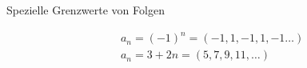 \begin{highlight}{Spezielle Grenzwerte von Folgen}
\begin{comment}
            \frac{1 - \cos n}{n^2} &\to \frac{1}{2}
        \end{align*}
    \end{minipage}
    \hfill\vline\hfill
    \begin{minipage}{0.3\linewidth}
        \begin{align*}
            \frac{1}{\arctan n} &\to 1\\
            \frac{e^n - 1}{n} &\to 1\\
            \frac{e^an - 1}{n} &\to a\\
            \left(1 + n\right)^{\frac{1}{n}} &\to e
        \end{align*}
    \end{minipage}
    \tcbsubtitle{Weitere Grenzwerte}
     \begin{minipage}{0.3\linewidth}
        \emph{$n \to -\infty$}
        \begin{align*}
            e^n &\to 0\\
            e^{-n} &\to \infty\\
            ne^n &\to 0
        \end{align*}
        \emph{$n \to 0+$}
        \begin{align*}
            n \ln n &\to 0
        \end{align*}
    \end{minipage}
    \hfill\vline\hfill
    \begin{minipage}{0.3\linewidth}
        \emph{$n \to \pm\infty$}
        \begin{align*}
            \left(1 + \frac{1}{n}\right)^n &\to e\\
            \left(1 + \frac{x}{n}\right)^an &\to e^ax
        \end{align*}
    \end{minipage}
    \hfill\vline\hfill
    \begin{minipage}{0.3\linewidth}
    \emph{$n \to \frac{\pi-}{2}$}
        \begin{align*}
            \tan x &\to +\infty
        \end{align*}
    \emph{$n \to \frac{\pi+}{2}$}
        \begin{align*}
            \tan x &\to -\infty
        \end{align*}
    \end{minipage}
    \end{comment}
    \begin{align*}
        &a_{n}=(-1)^{n}=(-1,1,-1,1,-1 \ldots) \\
        &a_{n}=3+2 n=(5,7,9,11, \ldots)
    \end{align*}
\end{highlight}


